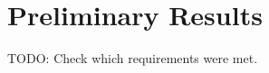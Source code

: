 
\section{Preliminary Results}
\label{sec:preliminary_results}

TODO: Check which requirements were met.
